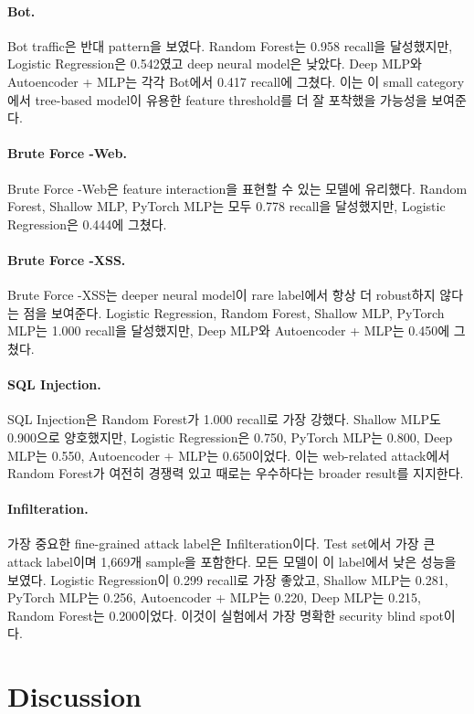 \documentclass[sigconf,nonacm]{acmart}
\begin{document}
\paragraph{Bot.}
Bot traffic은 반대 pattern을 보였다.
Random Forest는 0.958 recall을 달성했지만, Logistic Regression은 0.542였고 deep neural model은 낮았다.
Deep MLP와 Autoencoder + MLP는 각각 Bot에서 0.417 recall에 그쳤다.
이는 이 small category에서 tree-based model이 유용한 feature threshold를 더 잘 포착했을 가능성을 보여준다.

\paragraph{Brute Force -Web.}
Brute Force -Web은 feature interaction을 표현할 수 있는 모델에 유리했다.
Random Forest, Shallow MLP, PyTorch MLP는 모두 0.778 recall을 달성했지만, Logistic Regression은 0.444에 그쳤다.
\paragraph{Brute Force -XSS.}
Brute Force -XSS는 deeper neural model이 rare label에서 항상 더 robust하지 않다는 점을 보여준다.
Logistic Regression, Random Forest, Shallow MLP, PyTorch MLP는 1.000 recall을 달성했지만, Deep MLP와 Autoencoder + MLP는 0.450에 그쳤다.

\paragraph{SQL Injection.}
SQL Injection은 Random Forest가 1.000 recall로 가장 강했다.
Shallow MLP도 0.900으로 양호했지만, Logistic Regression은 0.750, PyTorch MLP는 0.800, Deep MLP는 0.550, Autoencoder + MLP는 0.650이었다.
이는 web-related attack에서 Random Forest가 여전히 경쟁력 있고 때로는 우수하다는 broader result를 지지한다.

\paragraph{Infilteration.}
가장 중요한 fine-grained attack label은 Infilteration이다.
Test set에서 가장 큰 attack label이며 1,669개 sample을 포함한다.
모든 모델이 이 label에서 낮은 성능을 보였다.
Logistic Regression이 0.299 recall로 가장 좋았고, Shallow MLP는 0.281, PyTorch MLP는 0.256, Autoencoder + MLP는 0.220, Deep MLP는 0.215, Random Forest는 0.200이었다.
이것이 실험에서 가장 명확한 security blind spot이다.

\section{Discussion}
\end{document}
